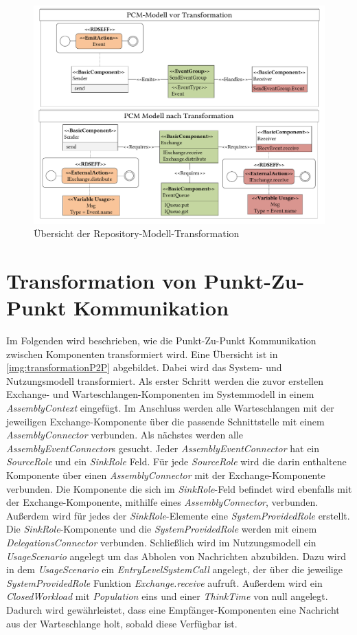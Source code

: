 \begin{figure}
\center
  \includegraphics[width=1.3\textwidth, angle=90]{images/transformation/transformationRepository.pdf}
  \caption{Übersicht der Repository-Modell-Transformation}
  \label{img:transformationRepository}
\end{figure}


\section{Transformation von Punkt-Zu-Punkt Kommunikation}
Im Folgenden wird beschrieben, wie die Punkt-Zu-Punkt Kommunikation zwischen Komponenten transformiert wird. Eine Übersicht ist in \autoref{img:transformationP2P} abgebildet. Dabei wird das System- und Nutzungsmodell transformiert. Als erster Schritt werden die zuvor erstellen Exchange- und Warteschlangen-Komponenten im Systemmodell in einem \emph{AssemblyContext} eingefügt. Im Anschluss werden alle Warteschlangen mit der jeweiligen Exchange-Komponente über die passende Schnittstelle mit einem \emph{AssemblyConnector} verbunden. Als nächstes werden alle \emph{AssemblyEventConnector}s gesucht. Jeder \emph{AssemblyEventConnector} hat ein \emph{SourceRole} und ein \emph{SinkRole} Feld. Für jede \emph{SourceRole} wird die darin enthaltene Komponente über einen \emph{AssemblyConnector} mit der Exchange-Komponente verbunden. Die Komponente die sich im \emph{SinkRole}-Feld befindet wird ebenfalls mit der Exchange-Komponente, mithilfe eines \emph{AssemblyConnector}, verbunden. Außerdem wird für jedes der \emph{SinkRole}-Elemente eine \emph{SystemProvidedRole} erstellt. Die \emph{SinkRole}-Komponente und die \emph{SystemProvidedRole} werden mit einem \emph{DelegationsConnector} verbunden. Schließlich wird im Nutzungsmodell ein \emph{UsageScenario} angelegt um das Abholen von Nachrichten abzubilden. Dazu wird in dem \emph{UsageScenario} ein \emph{EntryLevelSystemCall} angelegt, der über die jeweilige \emph{SystemProvidedRole} Funktion \emph{Exchange.receive} aufruft. Außerdem wird ein \emph{ClosedWorkload} mit \emph{Population} eins und einer \emph{ThinkTime} von null angelegt. Dadurch wird gewährleistet, dass eine Empfänger-Komponenten eine Nachricht aus der Warteschlange holt, sobald diese Verfügbar ist.

